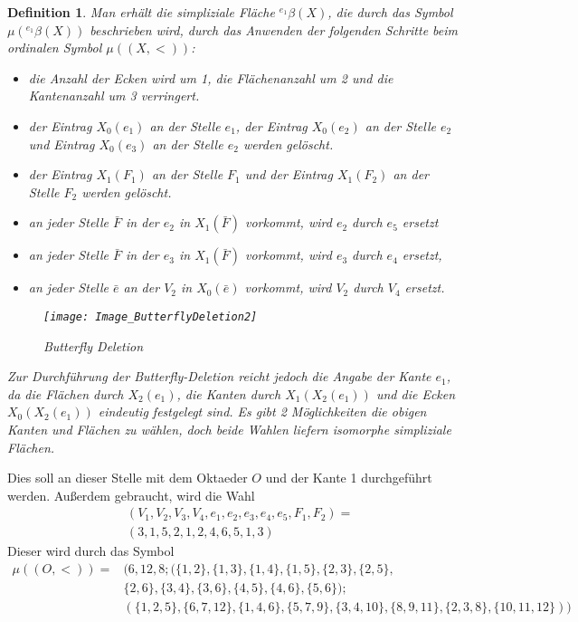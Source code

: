 \documentclass[12pt,titlepage,twoside,cleardoublepage]{article}
\theoremstyle{nummermitklammern}
\newtheorem{definition}[temp]{Definition}
\newtheorem{definition}[zahl]{Definition}
\numberwithin{equation}{section}
\begin{document}
\begin{definition}
Man erhält die simpliziale Fläche ${}^{e_1}\beta(X)$, die durch das Symbol $\mu({}^{e_1}\beta(X))$ beschrieben wird, durch das Anwenden der folgenden Schritte beim ordinalen Symbol $\mu((X,<))$: 
\begin{itemize}
\item die Anzahl der Ecken wird um 1, die Flächenanzahl um 2 und die Kantenanzahl um 3 verringert.
\item der Eintrag $X_0(e_1)$ an der Stelle $e_1$, der Eintrag $X_0(e_2)$ an der Stelle $e_2$ und Eintrag $X_0(e_3)$ an der Stelle $e_2$ werden gelöscht. 
\item der Eintrag $X_1(F_1)$ an der Stelle $F_1$ und der Eintrag $X_1(F_2)$ an der Stelle $F_2$ werden gelöscht. 
\
\item an jeder Stelle $\bar{F}$ in der $e_2$ in $X_1(\bar{F})$ vorkommt, wird $e_2$ durch $e_5$ ersetzt
\item an jeder Stelle $\bar{F}$ in der $e_3$ in $X_1(\bar{F})$ vorkommt, wird $e_3$ durch $e_4$ ersetzt,
\item an jeder Stelle $\bar{e}$ an der $V_2$ in $X_0(\bar{e})$ vorkommt, wird $V_2$ durch $V_4$ ersetzt.
\end{itemize}
\begin{figure}[H]
\begin{center}
\texttt{[image: Image\_ButterflyDeletion2]}
\end{center}
\caption{Butterfly Deletion}
\end{figure}
Zur Durchführung der Butterfly-Deletion reicht jedoch die Angabe der Kante $e_1$, da die Flächen durch $X_2(e_1)$, die Kanten durch $X_1(X_2(e_1))$ und die Ecken $X_0(X_2(e_1))$ eindeutig festgelegt sind. Es gibt 2 Möglichkeiten die obigen Kanten und Flächen zu wählen, doch beide Wahlen liefern isomorphe simpliziale Flächen.
 \end{definition}
 Dies soll an dieser Stelle mit dem Oktaeder $O$ und der Kante 1 durchgeführt werden. Außerdem gebraucht, wird die Wahl 
\begin{align*}
&(V_1,V_2,V_3,V_4,e_1,e_2,e_3,e_4,e_5,F_1,F_2)=\\&(3,1,5,2,1,2,4,6,5,1,3)
\end{align*}
 Dieser wird durch das Symbol
 \begin{align*}
 \mu((O,<))=&(6,12,8;(\{1,2\},\{1,3\},\{1,4\},\{1,5\},\{2,3\},\{2,5\},\\
 &\{2,6\},\{3,4\},\{3,6\},\{4,5\},\{4,6\},\{5,6\});\\
 &(\{1,2,5\},\{6,7,12\},\{1,4,6\},\{5,7,9\},\{3,4,10\},\{8,9,11\},\{2,3,8\},\{10,11,12\}))
 \end{align*}
\end{document}

